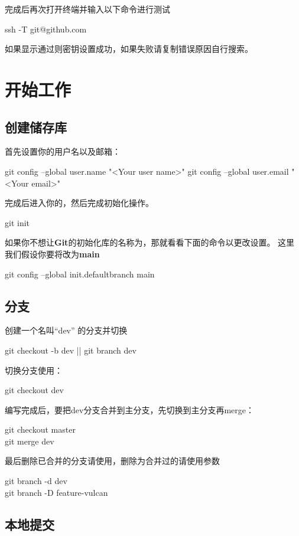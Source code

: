 \documentclass{report}
\begin{document}
完成后再次打开终端并输入以下命令进行测试

\begin{tcolorbox}
ssh -T git@github.com
\end{tcolorbox}

如果显示通过则密钥设置成功，如果失败请复制错误原因自行搜索。

\section*{开始工作}

\subsection*{创建储存库}

首先设置你的用户名以及邮箱：

\begin{tcolorbox}
git config --global user.name "<Your user name>"
git config --global user.email "<Your email>"
\end{tcolorbox}

完成后进入你的，然后完成初始化操作。

\begin{tcolorbox}
git init
\end{tcolorbox}

如果你不想让\textbf{Git}的初始化库的名称为，那就看看下面的命令以更改设置。
这里我们假设你要将改为\textbf{main}

\begin{tcolorbox}
git config --global init.defaultbranch main
\end{tcolorbox}

\subsection*{分支}

创建一个名叫“dev” 的分支并切换

\begin{tcolorbox}
git checkout -b dev || git branch dev
\end{tcolorbox}

切换分支使用：

\begin{tcolorbox}
git checkout dev
\end{tcolorbox}

编写完成后，要把dev分支合并到主分支，先切换到主分支再merge：

\begin{tcolorbox}
git checkout master \\
git merge dev
\end{tcolorbox}

最后删除已合并的分支请使用，删除为合并过的请使用参数

\begin{tcolorbox}
git branch -d dev \\
git branch -D feature-vulcan
\end{tcolorbox}

\subsection*{本地提交}
\end{document}

